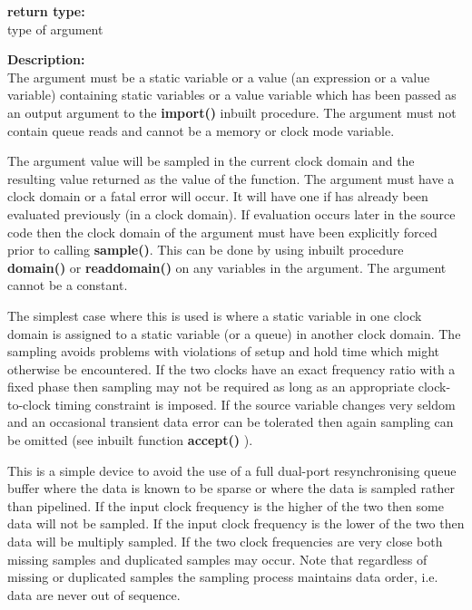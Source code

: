         {\bf return type:} \\
        type of argument

        {\bf Description:} \\
        The argument must be a static variable or a value (an expression or a
        value variable) containing static variables or a value variable which
        has been passed as an output argument to the {\bf import()} inbuilt
        procedure. The argument must not contain queue reads and cannot be a
        memory or clock mode variable.

        The argument value will be sampled in the current clock domain and the
        resulting value returned as the value of the function. The argument must
        have a clock domain or a fatal error will occur. It will have one if has
        already been evaluated previously (in a clock domain). If evaluation
        occurs later in the source code then the clock domain of the argument
        must have been explicitly forced prior to calling {\bf sample()}. This
        can be done by using inbuilt procedure {\bf domain()} or {\bf
        readdomain()} on any variables in the argument. The argument cannot be a
        constant.

        The simplest case where this is used is where a static variable
        in one clock domain is assigned to a static variable (or a queue)
        in another clock domain. The sampling avoids problems
        with violations of setup and hold time which might otherwise be
        encountered. If the two clocks have an exact frequency ratio
        with a fixed phase then sampling may not be required as
        long as an appropriate clock-to-clock timing constraint is
        imposed.
        If the source variable changes very seldom and an
        occasional transient data error can be tolerated then again
        sampling can be omitted (see inbuilt function {\bf accept()}
        ).

        This is a simple device to avoid the use of a full dual-port
        resynchronising queue buffer where the data is known to be sparse or
        where the data is sampled rather than pipelined. If the input clock
        frequency is the higher of the two then some data will not be sampled.
        If the input clock frequency is the lower of the two then data will be
        multiply sampled. If the two clock frequencies are very close both missing
        samples and duplicated samples may occur. Note that
        regardless of missing or duplicated samples the sampling process
        maintains data order, i.e. data are never out of sequence.

